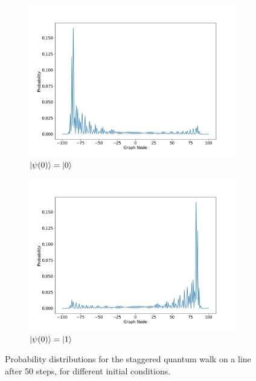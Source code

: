 \documentclass[../../dissertation.tex]{subfiles}
\begin{document}
\begin{figure}[!h]
	\begin{subfigure}[h]{0.50\textwidth}
	\includegraphics[width=\linewidth]{img/StagQuantumWalk/stagqwSingle0.png}
	\caption{$\ket{\psi(0)}=\ket{0}$}\label{fig:fig6}
	\end{subfigure}\hfill
	\begin{subfigure}[h]{0.50\textwidth}
	\includegraphics[width=\linewidth]{img/StagQuantumWalk/stagqwSingle1.png}
	\caption{$\ket{\psi(0)}=\ket{1}$}\label{fig:fig7}
	\end{subfigure}\hfill
	\caption{Probability distributions for the staggered quantum walk on a line after 50 steps, for different initial conditions.}
	\label{fig:stagQW2InitCond}
\end{figure}\par
\end{document}
